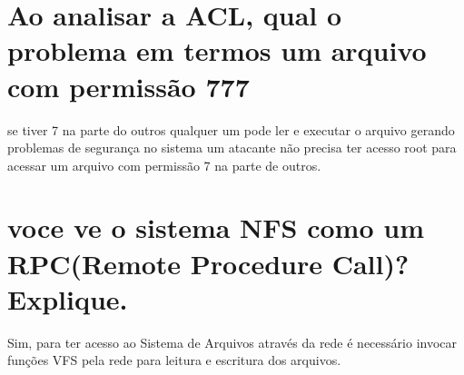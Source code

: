 \documentclass[12pt]{article}
\begin{document}
\section{Ao analisar a ACL, qual o problema em termos um arquivo com permissão 777}
	se tiver 7 na parte do outros qualquer um pode ler e executar o arquivo gerando problemas
	de segurança no sistema um atacante não precisa ter acesso root para acessar um arquivo
	com permissão 7 na parte de outros.
\section{voce ve o sistema NFS como um RPC(Remote Procedure Call)? Explique.}
	Sim, para ter acesso ao Sistema de Arquivos através da rede é necessário
	invocar funções VFS pela rede para leitura e escritura dos arquivos.
\end{document}

